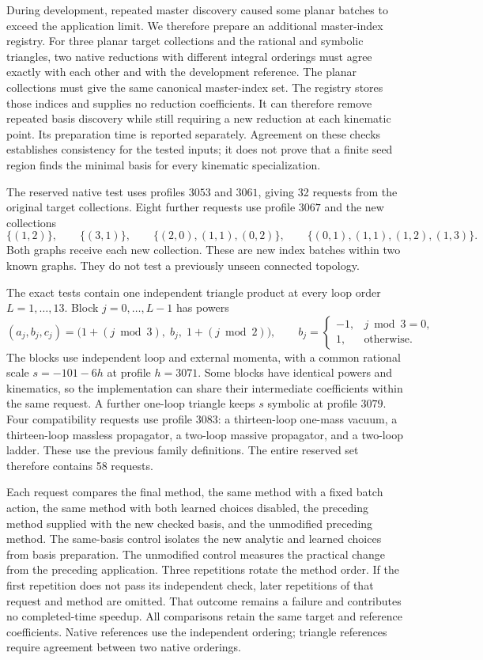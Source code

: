 During development, repeated master discovery caused some planar batches to exceed the application limit. We therefore prepare an additional master-index registry. For three planar target collections and the rational and symbolic triangles, two native reductions with different integral orderings must agree exactly with each other and with the development reference. The planar collections must give the same canonical master-index set. The registry stores those indices and supplies no reduction coefficients. It can therefore remove repeated basis discovery while still requiring a new reduction at each kinematic point. Its preparation time is reported separately. Agreement on these checks establishes consistency for the tested inputs; it does not prove that a finite seed region finds the minimal basis for every kinematic specialization.

The reserved native test uses profiles $3053$ and $3061$, giving 32 requests from the original target collections. Eight further requests use profile $3067$ and the new collections
\[
 \{(1,2)\},\qquad\{(3,1)\},\qquad
 \{(2,0),(1,1),(0,2)\},\qquad
 \{(0,1),(1,1),(1,2),(1,3)\}.
\]
Both graphs receive each new collection. These are new index batches within two known graphs. They do not test a previously unseen connected topology.

The exact tests contain one independent triangle product at every loop order $L=1,\ldots,13$. Block $j=0,\ldots,L-1$ has powers
\[
 (a_j,b_j,c_j)=
 \bigl(1+(j\bmod3),\; b_j,\;1+(j\bmod2)\bigr),
 \qquad b_j=\begin{cases}-1,&j\bmod3=0,\\1,&\text{otherwise}.\end{cases}
\]
The blocks use independent loop and external momenta, with a common rational scale $s=-101-6h$ at profile $h=3071$. Some blocks have identical powers and kinematics, so the implementation can share their intermediate coefficients within the same request. A further one-loop triangle keeps $s$ symbolic at profile $3079$. Four compatibility requests use profile $3083$: a thirteen-loop one-mass vacuum, a thirteen-loop massless propagator, a two-loop massive propagator, and a two-loop ladder. These use the previous family definitions. The entire reserved set therefore contains 58 requests.

Each request compares the final method, the same method with a fixed batch action, the same method with both learned choices disabled, the preceding method supplied with the new checked basis, and the unmodified preceding method. The same-basis control isolates the new analytic and learned choices from basis preparation. The unmodified control measures the practical change from the preceding application. Three repetitions rotate the method order. If the first repetition does not pass its independent check, later repetitions of that request and method are omitted. That outcome remains a failure and contributes no completed-time speedup. All comparisons retain the same target and reference coefficients. Native references use the independent ordering; triangle references require agreement between two native orderings.

